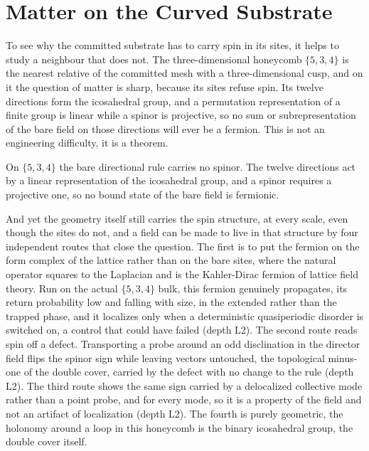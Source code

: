 \section{Matter on the Curved Substrate}

To see why the committed substrate has to carry spin in its sites, it helps to study a neighbour that does not. The three-dimensional honeycomb $\{5,3,4\}$ is the nearest relative of the committed mesh with a three-dimensional cusp, and on it the question of matter is sharp, because its sites refuse spin. Its twelve directions form the icosahedral group, and a permutation representation of a finite group is linear while a spinor is projective, so no sum or subrepresentation of the bare field on those directions will ever be a fermion. This is not an engineering difficulty, it is a theorem.

\begin{theorem}
On $\{5,3,4\}$ the bare directional rule carries no spinor. The twelve directions act by a linear representation of the icosahedral group, and a spinor requires a projective one, so no bound state of the bare field is fermionic.
\end{theorem}

And yet the geometry itself still carries the spin structure, at every scale, even though the sites do not, and a field can be made to live in that structure by four independent routes that close the question. The first is to put the fermion on the form complex of the lattice rather than on the bare sites, where the natural operator squares to the Laplacian and is the Kahler-Dirac fermion of lattice field theory. Run on the actual $\{5,3,4\}$ bulk, this fermion genuinely propagates, its return probability low and falling with size, in the extended rather than the trapped phase, and it localizes only when a deterministic quasiperiodic disorder is switched on, a control that could have failed (depth L2). The second route reads spin off a defect. Transporting a probe around an odd disclination in the director field flips the spinor sign while leaving vectors untouched, the topological minus-one of the double cover, carried by the defect with no change to the rule (depth L2). The third route shows the same sign carried by a delocalized collective mode rather than a point probe, and for every mode, so it is a property of the field and not an artifact of localization (depth L2). The fourth is purely geometric, the holonomy around a loop in this honeycomb is the binary icosahedral group, the double cover itself.

